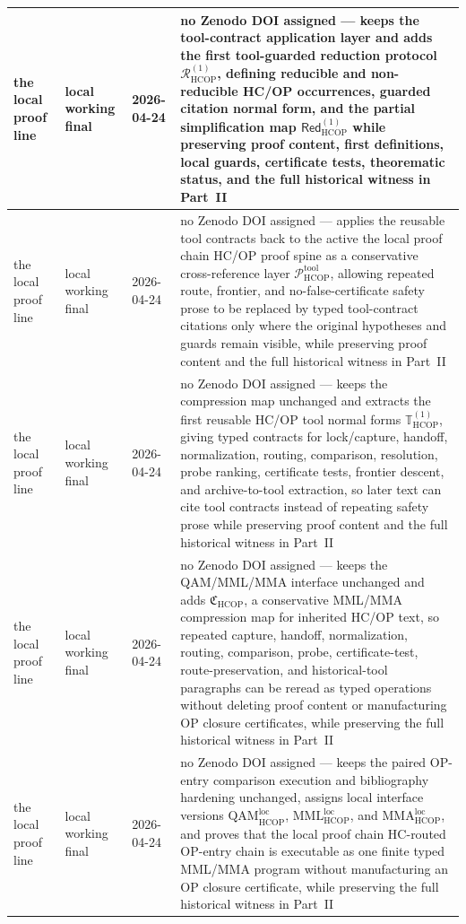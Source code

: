 \documentclass[12pt,a4paper]{article}
\begin{document}
{\begin{longtable}{|P{0.14\textwidth}|P{0.17\textwidth}|P{0.15\textwidth}|P{0.42\textwidth}|}
\hline
the local proof line & local working final & 2026-04-24 & no Zenodo DOI assigned --- keeps the tool-contract application layer and adds the first tool-guarded reduction protocol \(\mathcal R_{\mathrm{HCOP}}^{(1)}\), defining reducible and non-reducible HC/OP occurrences, guarded citation normal form, and the partial simplification map \(\mathsf{Red}_{\mathrm{HCOP}}^{(1)}\) while preserving proof content, first definitions, local guards, certificate tests, theorematic status, and the full historical witness in Part~II \\
\hline
the local proof line & local working final & 2026-04-24 & no Zenodo DOI assigned --- applies the reusable tool contracts back to the active the local proof chain HC/OP proof spine as a conservative cross-reference layer \(\mathcal P_{\mathrm{HCOP}}^{\mathrm{tool}}\), allowing repeated route, frontier, and no-false-certificate safety prose to be replaced by typed tool-contract citations only where the original hypotheses and guards remain visible, while preserving proof content and the full historical witness in Part~II \\
\hline
the local proof line & local working final & 2026-04-24 & no Zenodo DOI assigned --- keeps the compression map unchanged and extracts the first reusable HC/OP tool normal forms \(\mathbb T_{\mathrm{HCOP}}^{(1)}\), giving typed contracts for lock/capture, handoff, normalization, routing, comparison, resolution, probe ranking, certificate tests, frontier descent, and archive-to-tool extraction, so later text can cite tool contracts instead of repeating safety prose while preserving proof content and the full historical witness in Part~II \\
\hline
the local proof line & local working final & 2026-04-24 & no Zenodo DOI assigned --- keeps the QAM/MML/MMA interface unchanged and adds \(\mathfrak C_{\mathrm{HCOP}}\), a conservative MML/MMA compression map for inherited HC/OP text, so repeated capture, handoff, normalization, routing, comparison, probe, certificate-test, route-preservation, and historical-tool paragraphs can be reread as typed operations without deleting proof content or manufacturing OP closure certificates, while preserving the full historical witness in Part~II \\
\hline
the local proof line & local working final & 2026-04-24 & no Zenodo DOI assigned --- keeps the paired OP-entry comparison execution and bibliography hardening unchanged, assigns local interface versions \(\mathrm{QAM}_{\mathrm{HCOP}}^{\mathrm{loc}}\), \(\mathrm{MML}_{\mathrm{HCOP}}^{\mathrm{loc}}\), and \(\mathrm{MMA}_{\mathrm{HCOP}}^{\mathrm{loc}}\), and proves that the local proof chain HC-routed OP-entry chain is executable as one finite typed MML/MMA program without manufacturing an OP closure certificate, while preserving the full historical witness in Part~II \\

\end{longtable}}
\end{document}
